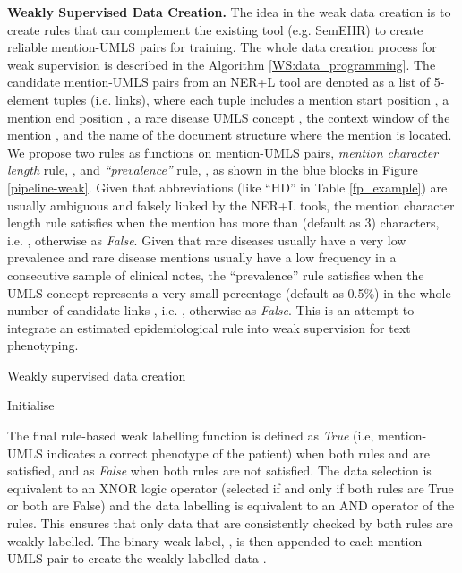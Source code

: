 \documentclass[twocolumn]{bmcart}
\begin{document}
\textbf{Weakly Supervised Data Creation.} The idea in the weak data creation is to create rules that can complement the existing tool (e.g. SemEHR) to create reliable mention-UMLS pairs for training. The whole data creation process for weak supervision is described in the Algorithm \ref{WS:data_programming}. The candidate mention-UMLS pairs from an NER+L tool are denoted as a list of 5-element tuples  (i.e. links), where each tuple includes a mention start position , a mention end position , a rare disease UMLS concept , the context window of the mention , and the name  of the document structure where the mention is located. We propose two rules as functions on mention-UMLS pairs, \textit{mention character length} rule, , and \textit{``prevalence''} rule, , as shown in the blue blocks in Figure \ref{pipeline-weak}. Given that abbreviations (like ``HD'' in Table \ref{fp_example}) are usually ambiguous and falsely linked by the NER+L tools, the mention character length rule  satisfies when the mention has more than  (default as 3) characters, i.e. , otherwise as \emph{False}. Given that rare diseases usually have a very low prevalence \cite{scot_gov_2021,textoris_genetic_2014} and rare disease mentions usually have a low frequency in a consecutive sample of clinical notes, the ``prevalence'' rule  satisfies when the UMLS concept represents a very small percentage  (default as 0.5\%) in the whole number of candidate links , i.e. , otherwise as \emph{False}. This is an attempt to integrate an estimated epidemiological rule into weak supervision for text phenotyping.

\begin{algorithm}[t]
\caption{Weakly supervised data creation}

\label{WS:data_programming}
\SetAlgoLined
{}

Initialise \;
\small{\;}
\;
\end{algorithm}

The final rule-based weak labelling function  is defined as \emph{True} (i.e, mention-UMLS indicates a correct phenotype of the patient) when both rules  and  are satisfied, and as \emph{False} when both rules are not satisfied. The data selection is equivalent to an XNOR logic operator (selected if and only if both rules are True or both are False) and the data labelling is equivalent to an AND operator of the rules. This ensures that only data that are consistently checked by both rules are weakly labelled. The binary weak label, , is then appended to each mention-UMLS pair to create the weakly labelled data .
\end{document}
